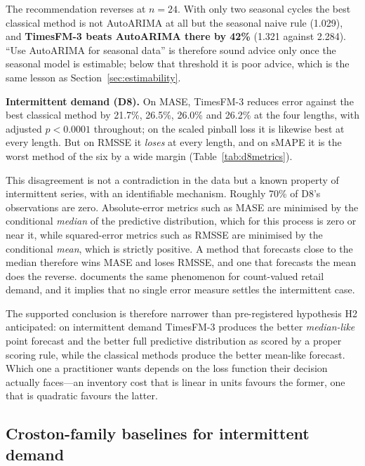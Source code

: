 \documentclass[11pt]{article}
\providecommand{\sectionref}[1]{Section~\ref{#1}}
\providecommand{\tableref}[1]{Table~\ref{#1}}
\begin{document}
The recommendation reverses at $n = 24$. With only two seasonal
cycles the best classical method is not AutoARIMA at all but the seasonal naive rule (1.029),
and \textbf{TimesFM-3 beats AutoARIMA there by 42\%} (1.321 against 2.284). ``Use AutoARIMA for
seasonal data'' is therefore sound advice only once the seasonal model is estimable; below that
threshold it is poor advice, which is the same lesson as \sectionref{sec:estimability}.

\textbf{Intermittent demand (D8).}
On MASE, TimesFM-3 reduces error against the best classical method by 21.7\%, 26.5\%, 26.0\% and
26.2\% at the four lengths, with adjusted $p < 0.0001$ throughout; on the scaled pinball loss it
is likewise best at every length. But on RMSSE it \emph{loses} at every length, and on sMAPE it
is the worst method of the six by a wide margin (\tableref{tab:d8metrics}).



This disagreement is not a contradiction in the data but a known property of intermittent
series, with an identifiable mechanism. Roughly 70\% of D8's observations are zero. Absolute-error metrics such as MASE
are minimised by the conditional \emph{median} of the predictive distribution, which for this
process is zero or near it, while squared-error metrics such as RMSSE are minimised by the
conditional \emph{mean}, which is strictly positive. A method that forecasts close to the median
therefore wins MASE and loses RMSSE, and one that forecasts the mean does the reverse. \citet{kolassa2016count}
documents the same phenomenon for count-valued retail demand, and it implies that no single error
measure settles the intermittent case.

The supported conclusion is therefore narrower than pre-registered hypothesis H2 anticipated: on
intermittent demand TimesFM-3 produces the better \emph{median-like} point forecast and the
better full predictive distribution as scored by a proper scoring rule, while the classical
methods produce the better mean-like forecast. Which one a practitioner wants depends on the
loss function their decision actually faces---an inventory cost that is linear in units favours
the former, one that is quadratic favours the latter.

\subsection{Croston-family baselines for intermittent demand}
\label{sec:croston}
\end{document}
